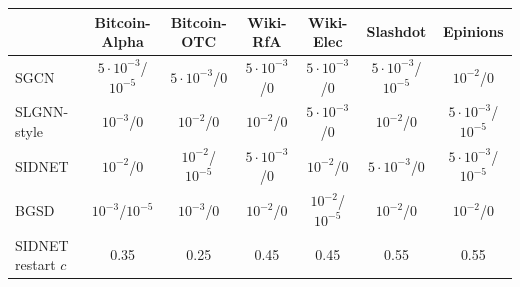 \begin{tabular}{@{}lcccccc@{}}
\toprule
 & Bitcoin-Alpha & Bitcoin-OTC & Wiki-RfA & Wiki-Elec & Slashdot & Epinions \\
\midrule
SGCN & $5{\cdot}10^{-3}$/$10^{-5}$ & $5{\cdot}10^{-3}$/0 & $5{\cdot}10^{-3}$/0 & $5{\cdot}10^{-3}$/0 & $5{\cdot}10^{-3}$/$10^{-5}$ & $10^{-2}$/0 \\
SLGNN-style & $10^{-3}$/0 & $10^{-2}$/0 & $10^{-2}$/0 & $5{\cdot}10^{-3}$/0 & $10^{-2}$/0 & $5{\cdot}10^{-3}$/$10^{-5}$ \\
SIDNET & $10^{-2}$/0 & $10^{-2}$/$10^{-5}$ & $5{\cdot}10^{-3}$/0 & $10^{-2}$/0 & $5{\cdot}10^{-3}$/0 & $5{\cdot}10^{-3}$/$10^{-5}$ \\
BGSD & $10^{-3}$/$10^{-5}$ & $10^{-3}$/0 & $10^{-2}$/0 & $10^{-2}$/$10^{-5}$ & $10^{-2}$/0 & $10^{-2}$/0 \\
\midrule
SIDNET restart $c$ & 0.35 & 0.25 & 0.45 & 0.45 & 0.55 & 0.55 \\
\bottomrule
\end{tabular}
